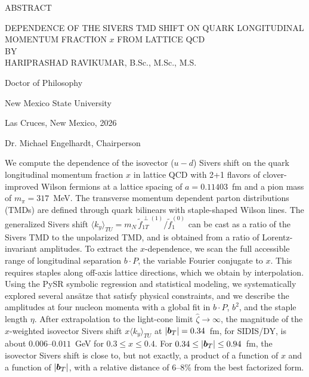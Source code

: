 \begin{center}
ABSTRACT
\end{center}
\vspace{0.3in}
\begin{center}
DEPENDENCE OF THE SIVERS TMD SHIFT ON QUARK LONGITUDINAL MOMENTUM FRACTION $x$ FROM LATTICE QCD
\\
BY
\\
HARIPRASHAD RAVIKUMAR, B.Sc., M.Sc., M.S.
\end{center}
\vspace{0.3in}
\begin{center}
Doctor of Philosophy

New Mexico State University

Las Cruces, New Mexico, 2026 

Dr. Michael Engelhardt, Chairperson 
\end{center}
\vspace{0.3in}
\hspace{\parindent}
We compute the dependence of the isovector ($u-d$) Sivers shift on the quark longitudinal momentum fraction $x$ in lattice QCD with 2+1 flavors of clover-improved Wilson fermions at a lattice spacing of \mbox{$a=0.11403$~fm} and a pion mass of \mbox{$m_\pi=317$~MeV}. The transverse momentum dependent parton distributions (TMDs) are defined through quark bilinears with staple-shaped Wilson lines. The generalized Sivers shift $\langle k_y\rangle_{TU}=m_N\,\tilde f_{1T}^{\perp(1)}/\tilde f_1^{(0)}$ can be cast as a ratio of the Sivers TMD to the unpolarized TMD, and is obtained from a ratio of Lorentz-invariant amplitudes. To extract the $x$-dependence, we scan the full accessible range of longitudinal separation $b\cdot P$, the variable Fourier conjugate to $x$. This requires staples along off-axis lattice directions, which we obtain by interpolation. Using the PySR symbolic regression and statistical modeling, we systematically explored several ans\"atze that satisfy physical constraints, and we describe the amplitudes at four nucleon momenta with a global fit in $b\cdot P$, $b^2$, and the staple length $\eta$. After extrapolation to the light-cone limit $\hat\zeta\to\infty$, the magnitude of the $x$-weighted isovector Sivers shift $x\langle k_y\rangle_{TU}$ at $|\boldsymbol{b}_T|=0.34$~fm, for SIDIS/DY, is about $0.006$--$0.011$~GeV for $0.3\le x\le 0.4$. For $0.34\le|\boldsymbol{b}_T|\le 0.94$~fm, the isovector Sivers shift is close to, but not exactly, a product of a function of $x$ and a function of $|\boldsymbol{b}_T|$, with a relative distance of 6--8\% from the best factorized form.

